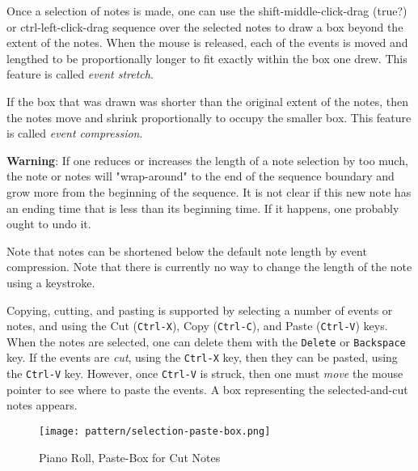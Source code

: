    Once a selection of notes is made, one can use the
   shift-middle-click-drag (true?) or ctrl-left-click-drag
   sequence over the selected notes to
   draw a box beyond the extent of the notes.  When the mouse is released,
   each of the events is moved and lengthed to be proportionally longer to
   fit exactly within the box one drew.
   This feature is called \textsl{event stretch}.

   If the box that was drawn was shorter than the original extent of the
   notes, then the notes move and shrink proportionally to occupy the
   smaller box.
   This feature is called \textsl{event compression}.
   
   \textbf{Warning}:  If one reduces or increases the length of a note selection
   by too much, the note or notes will "wrap-around" to the end of the sequence
   boundary and grow more from the beginning of the sequence. 
   It is not clear if this new note has an ending time that is less than its
   beginning time.  If it happens, one probably ought to undo it.

   Note that notes can be shortened below the default note length by event
   compression.  Note that there is currently no way to change the length of
   the note using a keystroke.

   Copying, cutting, and pasting is supported by selecting a number of events
   or notes, and using the
    Cut (\texttt{Ctrl-X}), 
    Copy (\texttt{Ctrl-C}),
    and Paste (\texttt{Ctrl-V}) keys.
   When the notes are selected,
   one can delete them with the \texttt{Delete} or \texttt{Backspace} key.
   If the events are \textsl{cut}, using the \texttt{Ctrl-X} key, then
   they can be pasted, using the \texttt{Ctrl-V} key.  However,
   once \texttt{Ctrl-V} is struck, then one must \textsl{move} the mouse
   pointer to see where to paste the events.  A box representing the
   selected-and-cut notes appears.

\begin{figure}[H]
   \centering 
   \texttt{[image: pattern/selection-paste-box.png]}
   \caption{Piano Roll, Paste-Box for Cut Notes}
   \label{fig:pattern_editor_selection_paste_box}
\end{figure}
   
